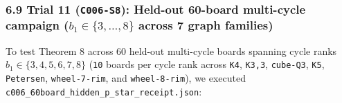 \documentclass[
  11pt,
]{article}
\newcommand{\passthrough}[1]{#1}
\begin{document}
\subsubsection{\texorpdfstring{6.9 Trial 11 (\texttt{C006-S8}): Held-out
60-board multi-cycle campaign
(\(b_1 \in \{3,\allowbreak  \dots,\allowbreak  8\}\) across 7 graph
families)}{6.9 Trial 11 (C006-S8): Held-out 60-board multi-cycle campaign (b\_1 \textbackslash in \textbackslash\{3,\textbackslash allowbreak  \textbackslash dots,\textbackslash allowbreak  8\textbackslash\} across 7 graph families)}}\label{trial-11-c006-s8-held-out-60-board-multi-cycle-campaign-b_1-in-3-dots-8-across-7-graph-families}

To test Theorem 8 across 60 held-out multi-cycle boards spanning cycle
ranks
\(b_1 \in \{3,\allowbreak  4,\allowbreak  5,\allowbreak  6,\allowbreak  7,\allowbreak  8\}\)
(\passthrough{\lstinline!10!} boards per cycle rank across
\passthrough{\lstinline!K4!}, \passthrough{\lstinline!K3,3!},
\passthrough{\lstinline!cube-Q3!}, \passthrough{\lstinline!K5!},
\passthrough{\lstinline!Petersen!},
\passthrough{\lstinline!wheel-7-rim!}, and
\passthrough{\lstinline!wheel-8-rim!}), we executed
\nolinkurl{c006_60board_hidden_p_star_receipt.json}:
\end{document}
